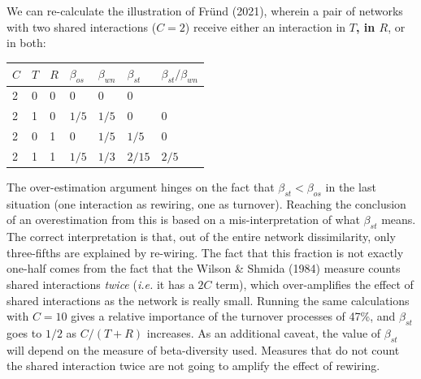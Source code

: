 \documentclass[11pt]{article}
\makeatletter
\def\maxwidth{\ifdim\Gin@nat@width>\linewidth\linewidth
\else\Gin@nat@width\fi}
\let\Oldincludegraphics\includegraphics
\renewcommand{\includegraphics}[1]{\Oldincludegraphics[width=\maxwidth]{#1}}
\providecommand{\DIFaddtex}[1]{{\bf #1}} %
\providecommand{\DIFdeltex}[1]{} %
\providecommand{\DIFaddbegin}{\protect\color{blue}} %
\providecommand{\DIFaddend}{\protect\color{black}} %
\providecommand{\DIFdelbegin}{\protect\color{red}} %
\providecommand{\DIFdelend}{\protect\color{black}} %
\providecommand{\DIFadd}[1]{\texorpdfstring{\DIFaddtex{#1}}{#1}} %
\providecommand{\DIFdel}[1]{\texorpdfstring{\DIFdeltex{#1}}{}} %
\newcommand{\DIFscaledelfig}{0.5}
\newlength{\DIFdelgraphicswidth} %
\newlength{\DIFdelgraphicsheight} %
\newcommand{\DIFaddincludegraphics}[2][]{{\color{blue}\fbox{\DIFOincludegraphics[#1]{#2}}}} %
\newcommand{\DIFdelincludegraphics}[2][]{%
\sbox{\DIFdelgraphicsbox}{\DIFOincludegraphics[#1]{#2}}%
\settoboxwidth{\DIFdelgraphicswidth}{\DIFdelgraphicsbox} %
\settoboxtotalheight{\DIFdelgraphicsheight}{\DIFdelgraphicsbox} %
\scalebox{\DIFscaledelfig}{%
\parbox[b]{\DIFdelgraphicswidth}{\usebox{\DIFdelgraphicsbox}\\[-\baselineskip] \rule{\DIFdelgraphicswidth}{0em}}\llap{\resizebox{\DIFdelgraphicswidth}{\DIFdelgraphicsheight}{%
\setlength{\unitlength}{\DIFdelgraphicswidth}%
\begin{picture}(1,1)%
\thicklines\linethickness{2pt} %
{\color[rgb]{1,0,0}\put(0,0){\framebox(1,1){}}}%
{\color[rgb]{1,0,0}\put(0,0){\line( 1,1){1}}}%
{\color[rgb]{1,0,0}\put(0,1){\line(1,-1){1}}}%
\end{picture}%
}\hspace*{3pt}}} %
} %
\DeclareRobustCommand{\DIFaddbegin}{\DIFOaddbegin \let\includegraphics\DIFaddincludegraphics} %
\DeclareRobustCommand{\DIFaddend}{\DIFOaddend \let\includegraphics\DIFOincludegraphics} %
\DeclareRobustCommand{\DIFdelbegin}{\DIFOdelbegin \let\includegraphics\DIFdelincludegraphics} %
\DeclareRobustCommand{\DIFdelend}{\DIFOaddend \let\includegraphics\DIFOincludegraphics} %
\makeatother
\begin{document}
We can re-calculate the illustration of Fründ (2021), wherein a pair of
networks with two shared interactions (\DIFdelbegin \DIFdel{\(A = 2\)}\DIFdelend \DIFaddbegin \DIFadd{\(C = 2\)}\DIFaddend ) receive either an
interaction in \DIFdelbegin \DIFdel{\(S\), in \(U\)}\DIFdelend \DIFaddbegin \DIFadd{\(T\), in \(R\)}\DIFaddend , or in both:

\begin{longtable}[]{@{}lllllll@{}}
\toprule
\DIFdelbegin \DIFdel{\(A\) }\DIFdelend \DIFaddbegin \DIFadd{\(C\) }\DIFaddend & \DIFdelbegin \DIFdel{\(S\) }\DIFdelend \DIFaddbegin \DIFadd{\(T\) }\DIFaddend & \DIFdelbegin \DIFdel{\(U\) }\DIFdelend \DIFaddbegin \DIFadd{\(R\) }\DIFaddend & \(\beta_{os}\) & \(\beta_{wn}\) & \(\beta_{st}\)
& \(\beta_{st}/\beta_{wn}\)\tabularnewline
\midrule
\endhead
2 & 0 & 0 & 0 & 0 & 0 &\tabularnewline
2 & 1 & 0 & \(1/5\) & \(1/5\) & 0 & 0\tabularnewline
2 & 0 & 1 & 0 & \(1/5\) & \(1/5\) & 0\tabularnewline
2 & 1 & 1 & \(1/5\) & \(1/3\) & \(2/15\) & \(2/5\)\tabularnewline
\bottomrule
\end{longtable}

The over-estimation argument hinges on the fact that
\(\beta_{st} < \beta_{os}\) in the last situation (one interaction as
rewiring, one as turnover). Reaching the conclusion of an overestimation
from this is based on a mis-interpretation of what \(\beta_{st}\) means.
The correct interpretation is that, out of the entire network
dissimilarity, only three-fifths are explained by re-wiring. The fact
that this fraction is not exactly one-half comes from the fact that the
Wilson \& Shmida (1984) measure counts shared interactions \emph{twice}
(\emph{i.e.} it has a \DIFdelbegin \DIFdel{\(2A\) }\DIFdelend \DIFaddbegin \DIFadd{\(2C\) }\DIFaddend term), which over-amplifies the effect of
shared interactions as the network is really small. Running the same
calculations with \DIFdelbegin \DIFdel{\(A = 10\) }\DIFdelend \DIFaddbegin \DIFadd{\(C = 10\) }\DIFaddend gives a relative importance of the turnover
processes of 47\%, and \(\beta_{st}\) goes to \(1/2\) as \DIFdelbegin \DIFdel{\(A/(S+U)\)
}\DIFdelend \DIFaddbegin \DIFadd{\(C/(T+R)\)
}\DIFaddend increases. As an additional caveat, the value of \(\beta_{st}\) will
depend on the measure of beta-diversity used. Measures that do not count
the shared interaction twice are not going to amplify the effect of
rewiring.

\DIFdelbegin %
\end{document}
